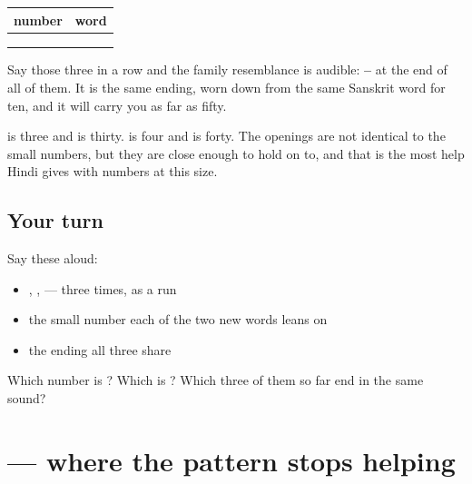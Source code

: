 \begin{grammarlens}[title={Grammar Lens: the tens are the part worth learning}]
\noindent
\begin{tabularx}{\linewidth}{@{}>{\raggedright\arraybackslash}X>{\raggedright\arraybackslash}X@{}}
\toprule
\textbf{number} & \textbf{word} \\
\midrule
20 & \hi{बीस} \\
30 & \hi{तीस} \\
40 & \hi{चालीस} \\
\bottomrule
\end{tabularx}

Say those three in a row and the family resemblance is audible: \textbf{–} at the end of all of them. It is the same ending, worn down from the same Sanskrit word for ten, and it will carry you as far as fifty.

\textbf{} is three and \textbf{} is thirty. \textbf{} is four and \textbf{} is forty. The openings are not identical to the small numbers, but they are close enough to hold on to, and that is the most help Hindi gives with numbers at this size.
\end{grammarlens}

\subsection*{Your turn}
Say these aloud:

\begin{itemize}
\raggedright
  \item {}, ,  — three times, as a run
  \item the small number each of the two new words leans on
  \item the ending all three share
\end{itemize}

\begin{tcolorbox}[breakable,colback=teal!4,colframe=teal!35!black,title={Before you move on}]
Which number is \textbf{}? Which is \textbf{}? Which three of them so far end in the same sound?
\end{tcolorbox}
\section[\texorpdfstring{\hi{पचास} \hi{साठ} (pacās sāṭh)}{पचास साठ (pacās sāṭh)}]{  — where the pattern stops helping}

